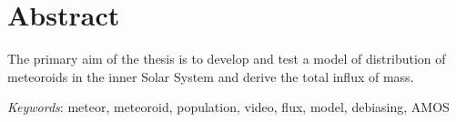 \section*{Abstract}
    The primary aim of the thesis is to develop and test a model of distribution
    of meteoroids in the inner Solar System and derive the total influx of mass.

    \emph{Keywords}: meteor, meteoroid, population, video, flux, model, debiasing, AMOS
